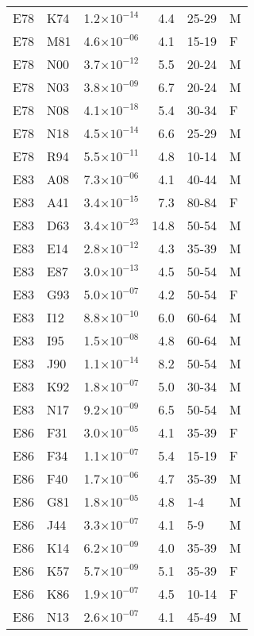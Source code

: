 \begin{longtable}{lllrll}
   E78 & K74 & 1.2$\times10^{-14}$ & 4.4 & 25-29 & M \\ 
   E78 & M81 & 4.6$\times10^{-06}$ & 4.1 & 15-19 & F \\ 
   E78 & N00 & 3.7$\times10^{-12}$ & 5.5 & 20-24 & M \\ 
   E78 & N03 & 3.8$\times10^{-09}$ & 6.7 & 20-24 & M \\ 
   E78 & N08 & 4.1$\times10^{-18}$ & 5.4 & 30-34 & F \\ 
   E78 & N18 & 4.5$\times10^{-14}$ & 6.6 & 25-29 & M \\ 
   E78 & R94 & 5.5$\times10^{-11}$ & 4.8 & 10-14 & M \\ 
   E83 & A08 & 7.3$\times10^{-06}$ & 4.1 & 40-44 & M \\ 
   E83 & A41 & 3.4$\times10^{-15}$ & 7.3 & 80-84 & F \\ 
   E83 & D63 & 3.4$\times10^{-23}$ & 14.8 & 50-54 & M \\ 
   E83 & E14 & 2.8$\times10^{-12}$ & 4.3 & 35-39 & M \\ 
   E83 & E87 & 3.0$\times10^{-13}$ & 4.5 & 50-54 & M \\ 
   E83 & G93 & 5.0$\times10^{-07}$ & 4.2 & 50-54 & F \\ 
   E83 & I12 & 8.8$\times10^{-10}$ & 6.0 & 60-64 & M \\ 
   E83 & I95 & 1.5$\times10^{-08}$ & 4.8 & 60-64 & M \\ 
   E83 & J90 & 1.1$\times10^{-14}$ & 8.2 & 50-54 & M \\ 
   E83 & K92 & 1.8$\times10^{-07}$ & 5.0 & 30-34 & M \\ 
   E83 & N17 & 9.2$\times10^{-09}$ & 6.5 & 50-54 & M \\ 
   E86 & F31 & 3.0$\times10^{-05}$ & 4.1 & 35-39 & F \\ 
   E86 & F34 & 1.1$\times10^{-07}$ & 5.4 & 15-19 & F \\ 
   E86 & F40 & 1.7$\times10^{-06}$ & 4.7 & 35-39 & M \\ 
   E86 & G81 & 1.8$\times10^{-05}$ & 4.8 & 1-4 & M \\ 
   E86 & J44 & 3.3$\times10^{-07}$ & 4.1 & 5-9 & M \\ 
   E86 & K14 & 6.2$\times10^{-09}$ & 4.0 & 35-39 & M \\ 
   E86 & K57 & 5.7$\times10^{-09}$ & 5.1 & 35-39 & F \\ 
   E86 & K86 & 1.9$\times10^{-07}$ & 4.5 & 10-14 & F \\ 
   E86 & N13 & 2.6$\times10^{-07}$ & 4.1 & 45-49 & M \\ 

\end{longtable}
